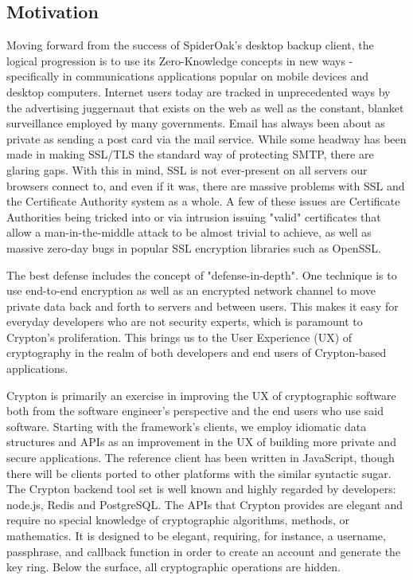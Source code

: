 \documentclass[conference]{IEEEtran}
\begin{document}
\subsection{Motivation}
Moving forward from the success of SpiderOak's desktop backup client,
the logical progression is to use its Zero-Knowledge concepts in new ways -
specifically in communications applications popular on mobile devices
and desktop computers. Internet users today are tracked in unprecedented
ways by the advertising juggernaut that exists on the web as well as the
constant, blanket surveillance employed by many governments.
Email has always been about as private as sending a post card via the mail
service. While some headway has been made in making SSL/TLS the standard
way of protecting SMTP, there are glaring gaps. With this in mind,
SSL is not ever-present on all servers our browsers connect to,
and even if it was, there are massive problems with SSL and the
Certificate Authority system as a whole. A few of these issues are
Certificate Authorities being tricked into or via intrusion issuing
"valid" certificates that allow a man-in-the-middle attack to be almost
trivial to achieve, as well as massive zero-day bugs in popular SSL
encryption libraries such as OpenSSL.

The best defense includes the concept of "defense-in-depth"\cite{defenseindepth}.
One technique is to use end-to-end encryption as well as an encrypted network
channel to move private data back and forth to servers and between users.
This makes it easy for everyday developers who are not security experts, which  is paramount to Crypton's proliferation. This brings us to the User Experience (UX) of cryptography in the realm of both developers and end users of Crypton-based applications.

Crypton is primarily an exercise in improving the UX of cryptographic
software both from the software engineer's perspective and the
end users who use said software. Starting with the framework's clients,
we employ idiomatic data structures and APIs as an improvement in the UX of building
more private and secure applications. The reference client has been written in
JavaScript, though there will be clients ported to other platforms with the similar
syntactic sugar. The Crypton backend tool set is well known
and highly regarded by developers: node.js, Redis and PostgreSQL. The APIs that
Crypton provides are elegant and require no special knowledge of cryptographic
algorithms, methods, or mathematics. It is designed to be elegant, requiring,
for instance, a username, passphrase, and callback function in order to create
an account and generate the key ring. Below the surface, all cryptographic
operations are hidden.
\end{document}
